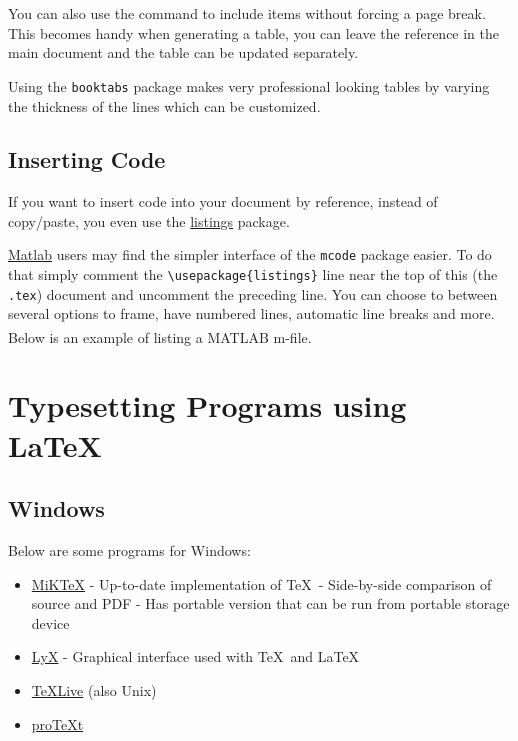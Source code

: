 \documentclass[12pt]{report}
\begin{document}
You can also use the \verb'' command to include items without forcing a page break.  This becomes handy when generating a table, you can leave the reference in the main document and the table can be updated separately.


Using the \verb'booktabs' package makes very professional looking tables by varying the thickness of the lines which can be customized.

\clearpage \section{Inserting Code}
If you want to insert code into your document by reference, instead of copy/paste, you even use the \href{https://en.wikibooks.org/wiki/LaTeX/Source_Code_Listings}{listings} package.  

\href{http://www.mathworks.com}{Matlab} users may find the simpler interface of the \verb'mcode' package easier.  To do that simply comment the \verb'\usepackage{listings}' line near the top of this (the \verb'.tex') document and uncomment the preceding line. You can choose to between several options to frame, have numbered lines, automatic line breaks and more.  Below is an example of listing a MATLAB\textsuperscript{\textregistered} m-file.



\chapter[Programs]{Typesetting Programs using \LaTeX\ }
\section{Windows}
Below are some programs for Windows:
\begin{itemize}
\item \href{http://miktex.org/}{MiK\TeX}
\subitem- Up-to-date implementation of \TeX\
\subitem- Side-by-side comparison of source and PDF
\subitem- Has portable version that can be run from portable storage device
\item \href{http://www.lyx.org/}{LyX}
\subitem- Graphical interface used with \TeX\ and \LaTeX\
\item \href{http://www.tug.org/texlive/}{\TeX Live} (also Unix)
\item \href{http://www.tug.org/protext/}{pro\TeX t}
\end{itemize}
\end{document}
